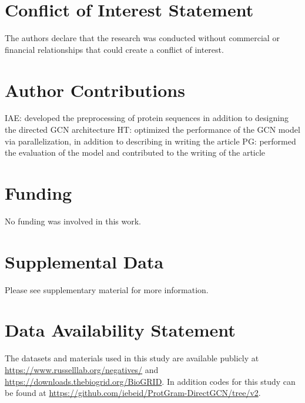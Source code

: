 \documentclass[utf8]{FrontiersinHarvard}
\begin{document}
	\section*{Conflict of Interest Statement}
	The authors declare that the research was conducted without commercial or financial relationships that could create a conflict of interest.
	
	\section*{Author Contributions}
	IAE: developed the preprocessing of protein sequences in addition to designing the directed GCN architecture
	HT: optimized the performance of the GCN model via parallelization, in addition to describing in writing the article
	PG: performed the evaluation of the model and contributed to the writing of the article  
	
	\section*{Funding}
	No funding was involved in this work.
	
	
	\section*{Supplemental Data}
	Please see supplementary material for more information.
	
	\section*{Data Availability Statement}
	The datasets and materials used in this study are available publicly at \url{https://www.russelllab.org/negatives/} and \url{https://downloads.thebiogrid.org/BioGRID}. In addition codes for this study can be found at \url{https://github.com/iebeid/ProtGram-DirectGCN/tree/v2}.
	
	
	
	
	
	
\end{document}
